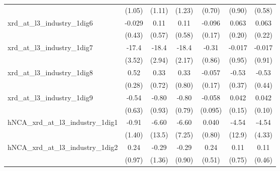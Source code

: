 {\begin{tabular}{l*{6}{c}}
                    &      (1.05)         &      (1.11)         &      (1.23)         &      (0.70)         &      (0.90)         &      (0.58)         \\
\addlinespace
xrd\_at\_l3\_industry\_1dig6&      -0.029         &        0.11         &        0.11         &      -0.096         &       0.063         &       0.063         \\
                    &      (0.43)         &      (0.57)         &      (0.58)         &      (0.17)         &      (0.20)         &      (0.22)         \\
\addlinespace
xrd\_at\_l3\_industry\_1dig7&       -17.4\sym{***}&       -18.4\sym{***}&       -18.4\sym{***}&       -0.31         &      -0.017         &      -0.017         \\
                    &      (3.52)         &      (2.94)         &      (2.17)         &      (0.86)         &      (0.95)         &      (0.91)         \\
\addlinespace
xrd\_at\_l3\_industry\_1dig8&        0.52\sym{*}  &        0.33         &        0.33         &      -0.057         &       -0.53         &       -0.53         \\
                    &      (0.28)         &      (0.72)         &      (0.80)         &      (0.17)         &      (0.37)         &      (0.44)         \\
\addlinespace
xrd\_at\_l3\_industry\_1dig9&       -0.54         &       -0.80         &       -0.80         &      -0.058         &       0.042         &       0.042         \\
                    &      (0.63)         &      (0.93)         &      (0.79)         &     (0.095)         &      (0.15)         &      (0.10)         \\
\addlinespace
hNCA\_xrd\_at\_l3\_industry\_1dig1&       -0.91         &       -6.60         &       -6.60         &       0.040         &       -4.54         &       -4.54         \\
                    &      (1.40)         &      (13.5)         &      (7.25)         &      (0.80)         &      (12.9)         &      (4.33)         \\
\addlinespace
hNCA\_xrd\_at\_l3\_industry\_1dig2&        0.24         &       -0.29         &       -0.29         &        0.24         &        0.11         &        0.11         \\
                    &      (0.97)         &      (1.36)         &      (0.90)         &      (0.51)         &      (0.75)         &      (0.46)         \\

\end{tabular}}
